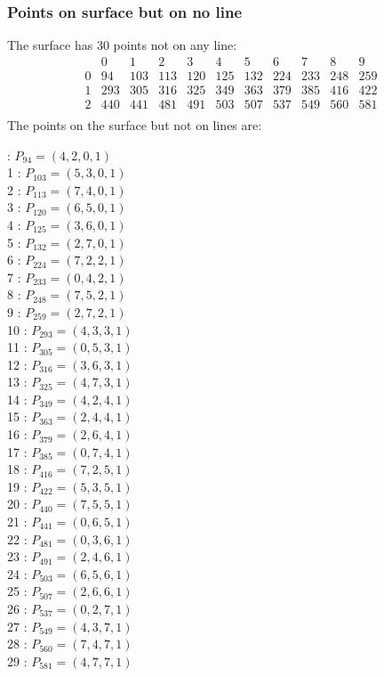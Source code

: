 \documentclass{article}
\begin{document}
{\subsubsection*{Points on surface but on no line}
The surface has 30 points not on any line:\\
$$
\begin{array}{r|*{10}{r}}
 & 0 & 1 & 2 & 3 & 4 & 5 & 6 & 7 & 8 & 9\\
\hline
0 & 94 & 103 & 113 & 120 & 125 & 132 & 224 & 233 & 248 & 259\\
1 & 293 & 305 & 316 & 325 & 349 & 363 & 379 & 385 & 416 & 422\\
2 & 440 & 441 & 481 & 491 & 503 & 507 & 537 & 549 & 560 & 581\\
\end{array}
$$
The points on the surface but not on lines are:\\
\begin{multicols}{2}
 : $P_{94}=( 4, 2, 0, 1 )$\\
1 : $P_{103}=( 5, 3, 0, 1 )$\\
2 : $P_{113}=( 7, 4, 0, 1 )$\\
3 : $P_{120}=( 6, 5, 0, 1 )$\\
4 : $P_{125}=( 3, 6, 0, 1 )$\\
5 : $P_{132}=( 2, 7, 0, 1 )$\\
6 : $P_{224}=( 7, 2, 2, 1 )$\\
7 : $P_{233}=( 0, 4, 2, 1 )$\\
8 : $P_{248}=( 7, 5, 2, 1 )$\\
9 : $P_{259}=( 2, 7, 2, 1 )$\\
10 : $P_{293}=( 4, 3, 3, 1 )$\\
11 : $P_{305}=( 0, 5, 3, 1 )$\\
12 : $P_{316}=( 3, 6, 3, 1 )$\\
13 : $P_{325}=( 4, 7, 3, 1 )$\\
14 : $P_{349}=( 4, 2, 4, 1 )$\\
15 : $P_{363}=( 2, 4, 4, 1 )$\\
16 : $P_{379}=( 2, 6, 4, 1 )$\\
17 : $P_{385}=( 0, 7, 4, 1 )$\\
18 : $P_{416}=( 7, 2, 5, 1 )$\\
19 : $P_{422}=( 5, 3, 5, 1 )$\\
20 : $P_{440}=( 7, 5, 5, 1 )$\\
21 : $P_{441}=( 0, 6, 5, 1 )$\\
22 : $P_{481}=( 0, 3, 6, 1 )$\\
23 : $P_{491}=( 2, 4, 6, 1 )$\\
24 : $P_{503}=( 6, 5, 6, 1 )$\\
25 : $P_{507}=( 2, 6, 6, 1 )$\\
26 : $P_{537}=( 0, 2, 7, 1 )$\\
27 : $P_{549}=( 4, 3, 7, 1 )$\\
28 : $P_{560}=( 7, 4, 7, 1 )$\\
29 : $P_{581}=( 4, 7, 7, 1 )$\\
\end{multicols}
}
\end{document}
